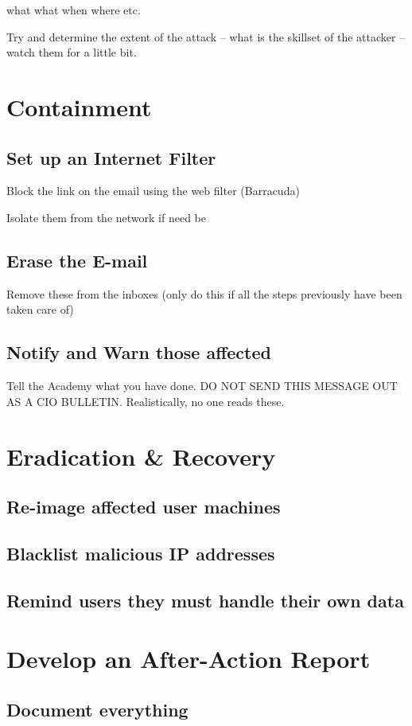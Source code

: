 \documentclass[11pt]{article}
\begin{document}
	what what when where etc.

	Try and determine the extent of the attack -- what is the skillset of the attacker --
	watch them for a little bit.

	\section{Containment}
	\subsection{Set up an Internet Filter}
	Block the link on the email using the web filter (Barracuda)

	Isolate them from the network if need be

	\subsection{Erase the E-mail}
	Remove these from the inboxes (only do this if all the steps previously have been taken care of)

	\subsection{Notify and Warn those affected}
	Tell the Academy what you have done.
	DO NOT SEND THIS MESSAGE OUT AS A CIO BULLETIN. Realistically, no one reads these.


	\section{Eradication \& Recovery}
	\subsection{Re-image affected user machines}
	\subsection{Blacklist malicious IP addresses}
	\subsection{Remind users they must handle their own data}


	\section{Develop an After-Action Report}
	\subsection{Document everything}
\end{document}
